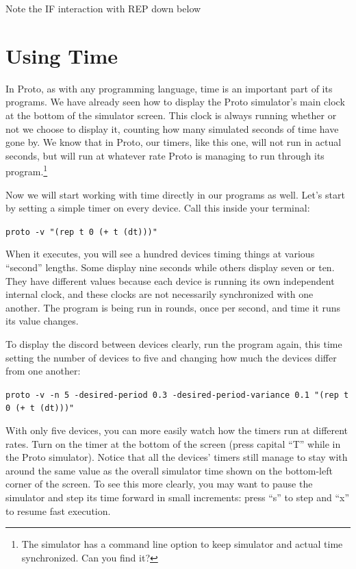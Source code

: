 \documentclass{article}
\newcommand\code[1]{\begin{center}\var{#1}\end{center}}
\newcommand\var[1]{{\tt #1}}
\begin{document}
Note the IF interaction with REP down below

\section{Using Time}

In Proto, as with any programming language, time is an important part
of its programs.  We have already seen how to display the Proto
simulator's main clock at the bottom of the simulator screen.  This
clock is always running whether or not we choose to display it,
counting how many simulated seconds of time have gone by.  We know
that in Proto, our timers, like this one, will not run in actual
seconds, but will run at whatever rate Proto is managing to run
through its program.\footnote{The simulator has a command line option
  to keep simulator and actual time synchronized.  Can you find it?}

Now we will start working with time directly in our programs as well.
Let's start by setting a simple timer on every device.  Call this
inside your terminal:

\code{proto -v "(rep t 0 (+ t (dt)))"}
	
When it executes, you will see a hundred devices timing things at
various ``second'' lengths.  Some display nine seconds while others
display seven or ten.  They have different values because each device
is running its own independent internal clock, and these clocks are
not necessarily synchronized with one another.  The program is being
run in rounds, once per second, and time it runs its value changes.

To display the discord between devices clearly, run the program again,
this time setting the number of devices to five and changing how much
the devices differ from one another:

\code{proto -v -n 5 -desired-period 0.3 -desired-period-variance 0.1 "(rep t 0 (+ t (dt)))"}

With only five devices, you can more easily watch how the timers run
at different rates.  Turn on the timer at the bottom of the screen
(press capital ``T'' while in the Proto simulator).  Notice that all
the devices' timers still manage to stay with around the same value as
the overall simulator time shown on the bottom-left corner of the
screen.  To see this more clearly, you may want to pause the simulator
and step its time forward in small increments: press ``s'' to step and
``x'' to resume fast execution.
\end{document}
